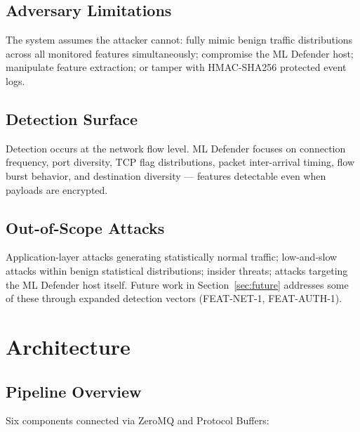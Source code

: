 \documentclass[11pt,a4paper]{article}
\begin{document}
\subsection{Adversary Limitations}
The system assumes the attacker cannot: fully mimic benign traffic distributions across all
monitored features simultaneously; compromise the ML Defender host; manipulate feature
extraction; or tamper with HMAC-SHA256 protected event logs.

\subsection{Detection Surface}
Detection occurs at the network flow level. ML Defender focuses on connection frequency,
port diversity, TCP flag distributions, packet inter-arrival timing, flow burst behavior, and
destination diversity --- features detectable even when payloads are encrypted.

\subsection{Out-of-Scope Attacks}
Application-layer attacks generating statistically normal traffic; low-and-slow attacks
within benign statistical distributions; insider threats; attacks targeting the ML Defender
host itself. Future work in Section~\ref{sec:future} addresses some of these through expanded
detection vectors (FEAT-NET-1, FEAT-AUTH-1).

\section{Architecture}

\subsection{Pipeline Overview}

Six components connected via ZeroMQ and Protocol Buffers:
\end{document}
